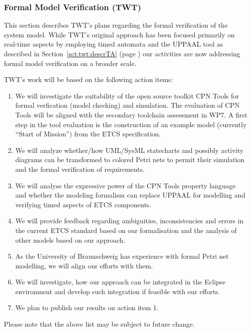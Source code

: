 \documentclass{template/openetcs_report}
\begin{document}
\subsubsection{Formal Model Verification (TWT)}
\label{sec:real-time-TA-openETCS}

This section describes TWT's plans regarding the formal verification of the system model. While TWT's original approach has been focused primarily on real-time aspects by employing timed automata and the UPPAAL tool as described in Section~\ref{sct:twt:descrTA} (page
\pageref{sct:twt:descrTA}) our activities are now addressing formal model verification on a broader scale. 

TWT's work will be based on the following action items:
\begin{enumerate}
  \item We will investigate the suitability of the open source toolkit CPN Tools\cite{CPNTools} for formal verfication (model checking) and simulation. The evaluation of CPN Tools will be aligned with the secondary toolchain assessment in WP7. A first step in the tool evaluation is the construction of an example model (currently ``Start of Mission'') from the ETCS specification.
  \item We will analyze whether/how UML/SysML statecharts and possibly activity diagrams can be
transformed to colored Petri nets to permit their simulation and the formal verification of requirements. 
  \item We will analyse the expressive power of the CPN Tools property language and whether the modeling formalism can replace UPPAAL for modelling and verifying timed aspects of ETCS components.
  \item We will provide feedback regarding ambiguities, inconsistencies and errors in the current ETCS standard based on our formalisation and the analysis of other models based on our approach.
  \item As the University of Braunschweig has experience with formal Petri net modelling, we will align our efforts with them.
  \item We will investigate, how our approach can be integrated in the
Eclipse environment and develop such integration if feasible with our
efforts.
  \item We plan to publish our results on action item 1.
\end{enumerate}

Please note that the above list may be subject to future change.
\end{document}
